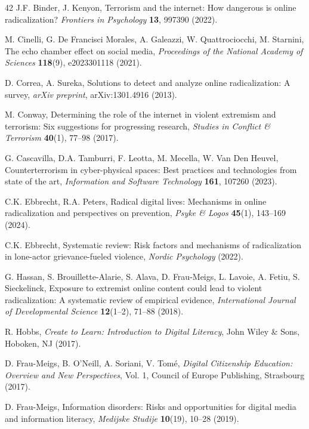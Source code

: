 \documentclass[10pt]{NSP1}
\begin{document}
\begin{thebibliography}{42}
		 J.F. Binder, J. Kenyon, Terrorism and the internet: How dangerous is online radicalization? \textit{Frontiers in Psychology} \textbf{13}, 997390 (2022).
		
		 M. Cinelli, G. De Francisci Morales, A. Galeazzi, W. Quattrociocchi, M. Starnini, The echo chamber effect on social media, \textit{Proceedings of the National Academy of Sciences} \textbf{118}(9), e2023301118 (2021).
		
		 D. Correa, A. Sureka, Solutions to detect and analyze online radicalization: A survey, \textit{arXiv preprint}, arXiv:1301.4916 (2013).
		
		 M. Conway, Determining the role of the internet in violent extremism and terrorism: Six suggestions for progressing research, \textit{Studies in Conflict \& Terrorism} \textbf{40}(1), 77–98 (2017).
		
		 G. Cascavilla, D.A. Tamburri, F. Leotta, M. Mecella, W. Van Den Heuvel, Counterterrorism in cyber-physical spaces: Best practices and technologies from state of the art, \textit{Information and Software Technology} \textbf{161}, 107260 (2023).
		
		 C.K. Ebbrecht, R.A. Peters, Radical digital lives: Mechanisms in online radicalization and perspectives on prevention, \textit{Psyke \& Logos} \textbf{45}(1), 143–169 (2024).
		
		 C.K. Ebbrecht, Systematic review: Risk factors and mechanisms of radicalization in lone-actor grievance-fueled violence, \textit{Nordic Psychology} (2022).
		
		 G. Hassan, S. Brouillette-Alarie, S. Alava, D. Frau-Meigs, L. Lavoie, A. Fetiu, S. Sieckelinck, Exposure to extremist online content could lead to violent radicalization: A systematic review of empirical evidence, \textit{International Journal of Developmental Science} \textbf{12}(1–2), 71–88 (2018).
		
		 R. Hobbs, \textit{Create to Learn: Introduction to Digital Literacy}, John Wiley \& Sons, Hoboken, NJ (2017).
		
		 D. Frau-Meigs, B. O'Neill, A. Soriani, V. Tom\'e, \textit{Digital Citizenship Education: Overview and New Perspectives}, Vol. 1, Council of Europe Publishing, Strasbourg (2017).
		
		 D. Frau-Meigs, Information disorders: Risks and opportunities for digital media and information literacy, \textit{Medijske Studije} \textbf{10}(19), 10–28 (2019).
		

\end{thebibliography}
\end{document}
